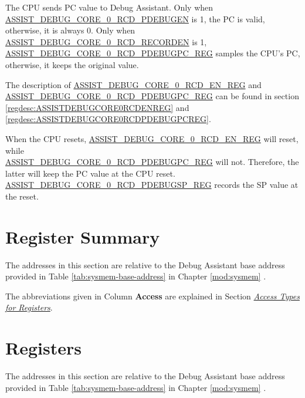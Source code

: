 \documentclass[main\_\_EN.tex]{subfiles}
\begin{document}
The CPU sends PC value to Debug Assistant. Only when \hyperref[fielddesc:ASSISTDEBUGCORE0RCDPDEBUGEN]{ASSIST\_DEBUG\_CORE\_0\_RCD\_PDEBUGEN} is 1, the PC is valid, otherwise, it is always 0. Only when \hyperref[fielddesc:ASSISTDEBUGCORE0RCDRECORDEN]{ASSIST\_DEBUG\_CORE\_0\_RCD\_RECORDEN} is 1, \hyperref[regdesc:ASSISTDEBUGCORE0RCDPDEBUGPCREG]{ASSIST\_DEBUG\_CORE\_0\_RCD\_PDEBUGPC\_REG} samples the CPU's PC, otherwise, it keeps the original value.

The description of \hyperref[regdesc:ASSISTDEBUGCORE0RCDENREG]{ASSIST\_DEBUG\_CORE\_0\_RCD\_EN\_REG} and \hyperref[regdesc:ASSISTDEBUGCORE0RCDPDEBUGPCREG]{ASSIST\_DEBUG\_CORE\_0\_RCD\_PDEBUGPC\_REG} can be found in section \ref{regdesc:ASSISTDEBUGCORE0RCDENREG} and \ref{regdesc:ASSISTDEBUGCORE0RCDPDEBUGPCREG}.

When the CPU resets, \hyperref[regdesc:ASSISTDEBUGCORE0RCDENREG]{ASSIST\_DEBUG\_CORE\_0\_RCD\_EN\_REG} will reset, while \\ \hyperref[regdesc:ASSISTDEBUGCORE0RCDPDEBUGPCREG]{ASSIST\_DEBUG\_CORE\_0\_RCD\_PDEBUGPC\_REG} will not. Therefore, the latter will keep the PC value at the CPU reset. \hyperref[regdesc:ASSISTDEBUGCORE0RCDPDEBUGSPREG]{ASSIST\_DEBUG\_CORE\_0\_RCD\_PDEBUGSP\_REG} records the SP value at the reset.





\clearpage
\hypertarget{dbgassist-reg-summ}{}
\section{Register Summary}
\label{sec:dbgassist-reg-summ}

The addresses in this section are relative to the Debug Assistant base address provided in Table \ref{tab:sysmem-base-address} in Chapter \ref{mod:sysmem} \textit{}.

The abbreviations given in Column \textbf{Access} are explained in Section \hyperref[glossary-access-types]{\textit{Access Types for Registers}}.






\clearpage
\section{Registers}

The addresses in this section are relative to the Debug Assistant base address provided in Table \ref{tab:sysmem-base-address} in Chapter \ref{mod:sysmem} \textit{}.


\end{document}

